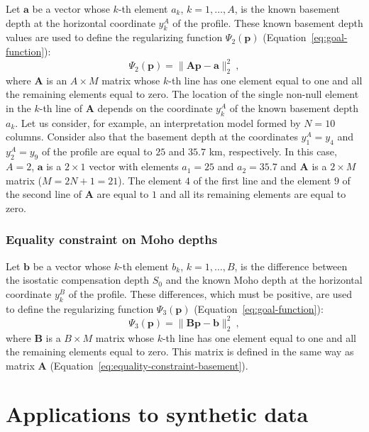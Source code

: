 \documentclass[manuscript]{geophysics}
\begin{document}
Let $\mathbf{a}$ be a vector whose $k$-th element $a_{k}$,
$k = 1, \dots, A$, is the known basement depth at the horizontal coordinate
$y^{A}_{k}$ of the profile. These known basement depth values are used to define 
the regularizing function $\Psi_{2}(\mathbf{p})$ 
(Equation~\ref{eq:goal-function}):
\begin{equation}
\Psi_{2}(\mathbf{p}) = \| \mathbf{A}\mathbf{p} - \mathbf{a} \|_{2}^{2} \: ,
\label{eq:equality-constraint-basement}
\end{equation}
where $\mathbf{A}$ is an $A \times M$ matrix whose $k$-th line has one element 
equal to one and all the remaining elements equal to zero. The location of the
single non-null element in the $k$-th line of $\mathbf{A}$ depends on the coordinate
$y^{A}_{k}$ of the known basement depth $a_{k}$. Let us consider, 
for example, an interpretation model formed by $N = 10$ columns. Consider also that 
the basement depth at the coordinates $y^{A}_{1} = y_{4}$ and $y^{A}_{2} = y_{9}$ of
the profile are equal to $25$ and $35.7$ km, respectively. In this case, $A = 2$,
$\mathbf{a}$ is a $2 \times 1$ vector with elements $a_{1} = 25$ and $a_{2} = 35.7$
and $\mathbf{A}$ is a $2 \times M$ matrix ($M = 2N + 1 = 21$). The element $4$ of the
first line and the element $9$ of the second line of $\mathbf{A}$ are equal to $1$ and
all its remaining elements are equal to zero.

\subsubsection*{Equality constraint on Moho depths}

Let $\mathbf{b}$ be a vector whose $k$-th element $b_{k}$,
$k = 1, \dots, B$, is the difference between the isostatic compensation depth
$S_{0}$ and the known Moho depth at the horizontal coordinate $y^{B}_{k}$ of the
profile. These differences, which must be positive, are used to define the 
regularizing function $\Psi_{3}(\mathbf{p})$ (Equation~\ref{eq:goal-function}):
\begin{equation}
\Psi_{3}(\mathbf{p}) = \| \mathbf{B}\mathbf{p} - \mathbf{b} \|_{2}^{2} \: ,
\label{eq:equality-constraint-moho}
\end{equation}
where $\mathbf{B}$ is a $B \times M$ matrix whose $k$-th line has one element 
equal to one and all the remaining elements equal to zero. This matrix is defined 
in the same way as matrix $\mathbf{A}$ (Equation~\ref{eq:equality-constraint-basement}).


\section{Applications to synthetic data}
\end{document}

